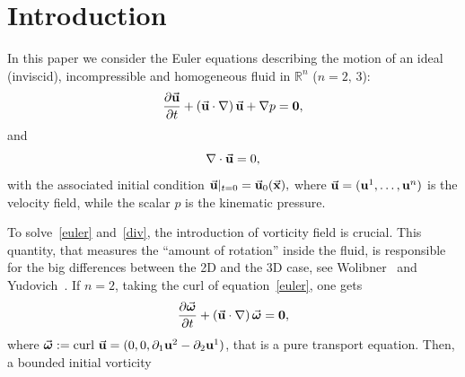 \documentclass[a4paper,11pt]{article}
\numberwithin{equation}{section}
\newcommand{\R}{\mathbb{R}}
\newcommand{\U}{\mbox{$\vec{\bf u}$}}
\newcommand{\UU}{\mbox{${\bf u}$}}
\newcommand{\vomega}{\mbox{$\vec{\boldsymbol\omega}$}}
\newcommand{\x}{\mbox{$\vec{\bf x}$}}
\begin{document}
\section{Introduction}
In this paper we consider the Euler equations describing the motion of
an ideal (inviscid), incompressible and homogeneous fluid in $\R^n$
($n=2,\,3$):
\begin{equation}\label{euler}
\frac{\partial \U}{\partial t} +(\U\cdot \nabla)\,\U+\nabla
p={\bf0},
\end{equation}
and
\begin{equation}
\nabla\cdot \U=0,\label{div}
\end{equation}
with the associated initial condition $\U|_{t=0}=\U_{0}(\x),$ where
$\U=(\UU^1,\dots,\UU^n)$ is the velocity field, while the scalar $p$ is
the kinematic pressure.\par 
%
To solve~\eqref{euler} and~\eqref{div}, the introduction of vorticity
field is crucial. This quantity, that measures the ``amount of
rotation'' inside the fluid, is responsible for the big differences
between the 2D and the 3D case, see Wolibner~\cite{Wol33} and
Yudovich~\cite{Yud63}. If $n=2$, taking the curl of
equation~\eqref{euler}, one gets
\begin{equation*}
{\displaystyle\frac{\partial \vomega}{\partial t} +(\U\cdot
  \nabla)\,\vomega={\bf0},}%
\end{equation*}
where 
%
%
$\vomega:=\text{curl}\ \U=(0,0,\partial_1\UU^2-\partial_2 \UU^1)$, %
that is a pure transport equation. Then, a bounded initial vorticity
\end{document}
